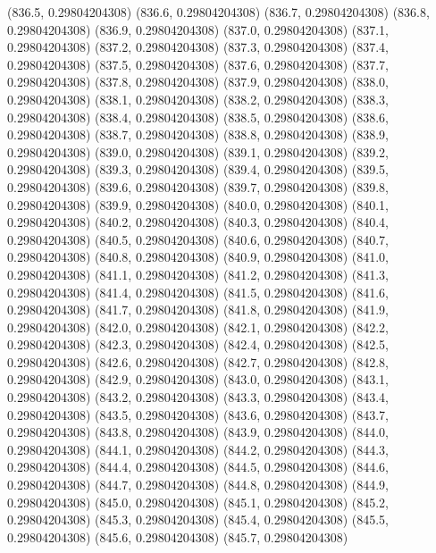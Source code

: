 {					(836.5, 0.29804204308)
					(836.6, 0.29804204308)
					(836.7, 0.29804204308)
					(836.8, 0.29804204308)
					(836.9, 0.29804204308)
					(837.0, 0.29804204308)
					(837.1, 0.29804204308)
					(837.2, 0.29804204308)
					(837.3, 0.29804204308)
					(837.4, 0.29804204308)
					(837.5, 0.29804204308)
					(837.6, 0.29804204308)
					(837.7, 0.29804204308)
					(837.8, 0.29804204308)
					(837.9, 0.29804204308)
					(838.0, 0.29804204308)
					(838.1, 0.29804204308)
					(838.2, 0.29804204308)
					(838.3, 0.29804204308)
					(838.4, 0.29804204308)
					(838.5, 0.29804204308)
					(838.6, 0.29804204308)
					(838.7, 0.29804204308)
					(838.8, 0.29804204308)
					(838.9, 0.29804204308)
					(839.0, 0.29804204308)
					(839.1, 0.29804204308)
					(839.2, 0.29804204308)
					(839.3, 0.29804204308)
					(839.4, 0.29804204308)
					(839.5, 0.29804204308)
					(839.6, 0.29804204308)
					(839.7, 0.29804204308)
					(839.8, 0.29804204308)
					(839.9, 0.29804204308)
					(840.0, 0.29804204308)
					(840.1, 0.29804204308)
					(840.2, 0.29804204308)
					(840.3, 0.29804204308)
					(840.4, 0.29804204308)
					(840.5, 0.29804204308)
					(840.6, 0.29804204308)
					(840.7, 0.29804204308)
					(840.8, 0.29804204308)
					(840.9, 0.29804204308)
					(841.0, 0.29804204308)
					(841.1, 0.29804204308)
					(841.2, 0.29804204308)
					(841.3, 0.29804204308)
					(841.4, 0.29804204308)
					(841.5, 0.29804204308)
					(841.6, 0.29804204308)
					(841.7, 0.29804204308)
					(841.8, 0.29804204308)
					(841.9, 0.29804204308)
					(842.0, 0.29804204308)
					(842.1, 0.29804204308)
					(842.2, 0.29804204308)
					(842.3, 0.29804204308)
					(842.4, 0.29804204308)
					(842.5, 0.29804204308)
					(842.6, 0.29804204308)
					(842.7, 0.29804204308)
					(842.8, 0.29804204308)
					(842.9, 0.29804204308)
					(843.0, 0.29804204308)
					(843.1, 0.29804204308)
					(843.2, 0.29804204308)
					(843.3, 0.29804204308)
					(843.4, 0.29804204308)
					(843.5, 0.29804204308)
					(843.6, 0.29804204308)
					(843.7, 0.29804204308)
					(843.8, 0.29804204308)
					(843.9, 0.29804204308)
					(844.0, 0.29804204308)
					(844.1, 0.29804204308)
					(844.2, 0.29804204308)
					(844.3, 0.29804204308)
					(844.4, 0.29804204308)
					(844.5, 0.29804204308)
					(844.6, 0.29804204308)
					(844.7, 0.29804204308)
					(844.8, 0.29804204308)
					(844.9, 0.29804204308)
					(845.0, 0.29804204308)
					(845.1, 0.29804204308)
					(845.2, 0.29804204308)
					(845.3, 0.29804204308)
					(845.4, 0.29804204308)
					(845.5, 0.29804204308)
					(845.6, 0.29804204308)
					(845.7, 0.29804204308)
}
